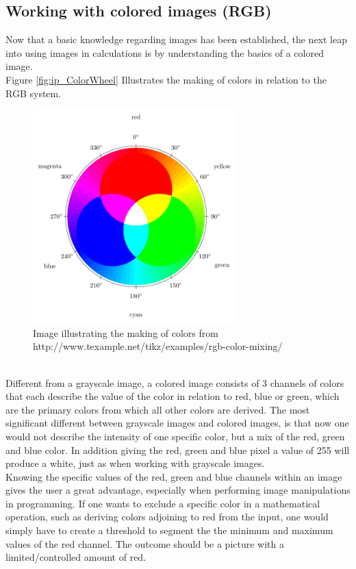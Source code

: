 \subsection{Working with colored images (RGB)}
Now that a basic knowledge regarding images has been established, the next leap into using images in calculations is by understanding the basics of a colored image.\\
Figure \eqref{fig:ip_ColorWheel} Illustrates the making of colors in relation to the RGB system.\\
\begin{figure}[htbp]
\centering
\includegraphics[width=0.70\textwidth]{Pictures/Theory/RGBColor.pdf}
\caption{Image illustrating the making of colors from http://www.texample.net/tikz/examples/rgb-color-mixing/}
\label{fig:ip_ColorWheel}
\end{figure}\\
Different from a grayscale image, a colored image consists of 3 channels of colors that each describe the value of the color in relation to red, blue or green, which are the primary colors from which all other colors are derived. The most significant different between grayscale images and colored images, is that now one would not describe the intensity of one specific color, but a mix of the red, green and blue color. In addition giving the red, green and blue pixel a value of 255 will produce a white, just as when working with grayscale images.\\
Knowing the specific values of the red, green and blue channels within an image gives the user a great advantage, especially when performing image manipulations in programming. If one wants to exclude a specific color in a mathematical operation, such as deriving colors adjoining to red from the input, one would simply have to create a threshold to segment the the minimum and maximum values of the red channel. The outcome should be a picture with a limited/controlled amount of red. 

